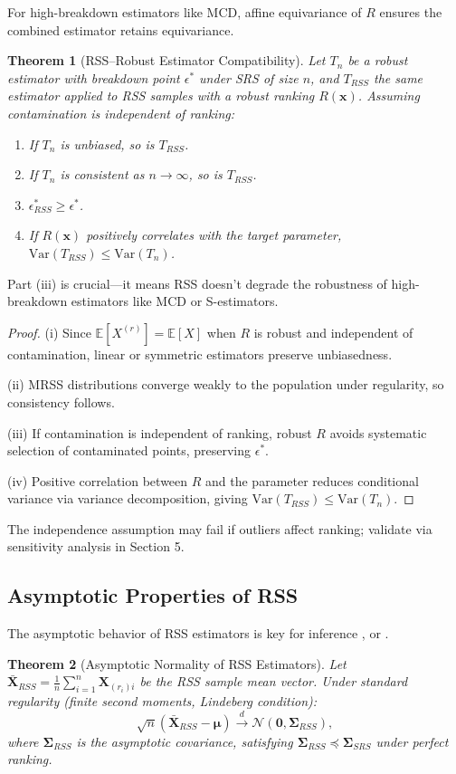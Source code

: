 \documentclass[12pt]{article}
\newtheorem{theorem}{Theorem}[section]
\begin{document}
For high-breakdown estimators like MCD, affine equivariance of $R$ ensures the combined estimator retains equivariance.
\begin{theorem}[RSS–Robust Estimator Compatibility]
\label{thm:rss_robust_compatibility}
Let $T_n$ be a robust estimator with breakdown point $\epsilon^*$ under SRS of size $n$, and $T_{RSS}$ the same estimator applied to RSS samples with a robust ranking $R(\mathbf{x})$. Assuming contamination is independent of ranking:
\begin{enumerate}
    \item If $T_n$ is unbiased, so is $T_{RSS}$.
    \item If $T_n$ is consistent as $n \to \infty$, so is $T_{RSS}$.
    \item $\epsilon^*_{RSS} \geq \epsilon^*$.
    \item If $R(\mathbf{x})$ positively correlates with the target parameter, $\text{Var}(T_{RSS}) \leq \text{Var}(T_n)$.
\end{enumerate}
\end{theorem}
Part (iii) is crucial—it means RSS doesn't degrade the robustness of high-breakdown estimators like MCD or S-estimators.
\begin{proof}
(i) Since $\mathbb{E}[X^{(r)}]=\mathbb{E}[X]$ when $R$ is robust and independent of contamination, linear or symmetric estimators preserve unbiasedness.

(ii) MRSS distributions converge weakly to the population under regularity, so consistency follows.

(iii) If contamination is independent of ranking, robust $R$ avoids systematic selection of contaminated points, preserving $\epsilon^*$.

(iv) Positive correlation between $R$ and the parameter reduces conditional variance via variance decomposition, giving $\text{Var}(T_{RSS}) \leq \text{Var}(T_n)$.
\end{proof}
The independence assumption may fail if outliers affect ranking; validate via sensitivity analysis in Section 5.
\subsection{Asymptotic Properties of RSS}

The asymptotic behavior of RSS estimators is key for inference
\cite{ChenStasnyWolfe2006, maronna2019robust}, or \cite{stokes1977efficiency}.

\begin{theorem}[Asymptotic Normality of RSS Estimators]
\label{thm:rss_asymptotic}
Let $\bar{\mathbf{X}}_{RSS} = \frac{1}{n} \sum_{i=1}^{n} \mathbf{X}_{(r_i)i}$ be the RSS sample mean vector. Under standard regularity (finite second moments, Lindeberg condition):
\[
\sqrt{n}(\bar{\mathbf{X}}_{RSS} - \boldsymbol{\mu}) \xrightarrow{d} \mathcal{N}(\mathbf{0}, \boldsymbol{\Sigma}_{RSS}),
\]
where $\boldsymbol{\Sigma}_{RSS}$ is the asymptotic covariance, satisfying $\boldsymbol{\Sigma}_{RSS} \preceq \boldsymbol{\Sigma}_{SRS}$ under perfect ranking.
\end{theorem}
\end{document}
